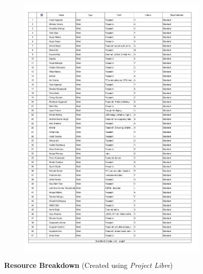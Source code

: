 \begin{figure}[H]
	\continuedfloat
	\begin{subfigure}[b]{\textwidth}
		\centering
		\includegraphics[page=2,width=\textwidth]{../../Images/Resources.pdf}
		\caption{}
	\end{subfigure}
	\caption{\textbf{Resource Breakdown} {(Created using \textit{Project Libre})}}
\end{figure}
